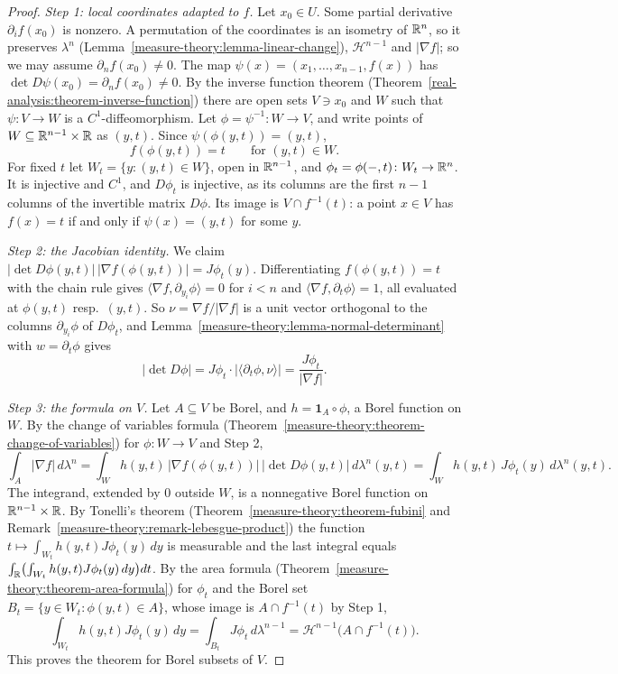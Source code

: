 \begin{proof}
\emph{Step 1: local coordinates adapted to $f$.} Let $x_0 \in U$. Some partial derivative $\partial_if(x_0)$ is nonzero. A permutation of the coordinates is an isometry of $\mathbb{R}^n$, so it preserves
$\lambda^n$ (Lemma~\ref{measure-theory:lemma-linear-change}), $\mathcal{H}^{n-1}$ and $|\nabla f|$; so we may assume $\partial_nf(x_0) \neq 0$. The map
$\psi(x) = (x_1, \ldots, x_{n-1}, f(x))$ has $\det D\psi(x_0) = \partial_nf(x_0) \neq 0$. By the inverse function theorem (Theorem~\ref{real-analysis:theorem-inverse-function}) there are open sets
$V \ni x_0$ and $W$ such that $\psi \colon V \to W$ is a $C^1$-diffeomorphism. Let $\phi = \psi^{-1} \colon W \to V$, and write points of $W \subseteq \mathbb{R}^{n-1} \times \mathbb{R}$ as $(y, t)$. Since
$\psi(\phi(y, t)) = (y, t)$,
\[
f(\phi(y, t)) = t \qquad\text{for } (y, t) \in W .
\]
For fixed $t$ let $W_t = \{y : (y, t) \in W\}$, open in $\mathbb{R}^{n-1}$, and $\phi_t = \phi(-, t) \colon W_t \to \mathbb{R}^n$. It is injective and $C^1$, and $D\phi_t$ is injective, as its columns are the first
$n - 1$ columns of the invertible matrix $D\phi$. Its image is $V \cap f^{-1}(t)$: a point $x \in V$ has $f(x) = t$ if and only if $\psi(x) = (y, t)$ for some $y$.

\emph{Step 2: the Jacobian identity.} We claim $|\det D\phi(y, t)|\,|\nabla f(\phi(y, t))| = J\phi_t(y)$. Differentiating $f(\phi(y, t)) = t$ with the chain rule gives
$\langle\nabla f, \partial_{y_i}\phi\rangle = 0$ for $i < n$ and $\langle\nabla f, \partial_t\phi\rangle = 1$, all evaluated at $\phi(y, t)$ resp.\ $(y, t)$. So $\nu = \nabla f/|\nabla f|$ is a unit vector
orthogonal to the columns $\partial_{y_i}\phi$ of $D\phi_t$, and Lemma~\ref{measure-theory:lemma-normal-determinant} with $w = \partial_t\phi$ gives
\[
|\det D\phi| = J\phi_t\cdot|\langle\partial_t\phi, \nu\rangle| = \frac{J\phi_t}{|\nabla f|} .
\]

\emph{Step 3: the formula on $V$.} Let $A \subseteq V$ be Borel, and $h = \mathbf{1}_A \circ \phi$, a Borel function on $W$. By the change of variables formula
(Theorem~\ref{measure-theory:theorem-change-of-variables}) for $\phi \colon W \to V$ and Step 2,
\[
\int_A|\nabla f|\,d\lambda^n = \int_Wh(y, t)\,|\nabla f(\phi(y, t))|\,|\det D\phi(y, t)|\,d\lambda^n(y, t) = \int_Wh(y, t)\,J\phi_t(y)\,d\lambda^n(y, t) .
\]
The integrand, extended by $0$ outside $W$, is a nonnegative Borel function on $\mathbb{R}^{n-1} \times \mathbb{R}$. By Tonelli's theorem (Theorem~\ref{measure-theory:theorem-fubini} and
Remark~\ref{measure-theory:remark-lebesgue-product}) the function $t \mapsto \int_{W_t}h(y, t)J\phi_t(y)\,dy$ is measurable and the last integral equals
$\int_{\mathbb{R}}\bigl(\int_{W_t}h(y, t)J\phi_t(y)\,dy\bigr)dt$. By the area formula (Theorem~\ref{measure-theory:theorem-area-formula}) for $\phi_t$ and the Borel set
$B_t = \{y \in W_t : \phi(y, t) \in A\}$, whose image is $A \cap f^{-1}(t)$ by Step 1,
\[
\int_{W_t}h(y, t)J\phi_t(y)\,dy = \int_{B_t}J\phi_t\,d\lambda^{n-1} = \mathcal{H}^{n-1}\bigl(A \cap f^{-1}(t)\bigr).
\]
This proves the theorem for Borel subsets of $V$.


\end{proof}
